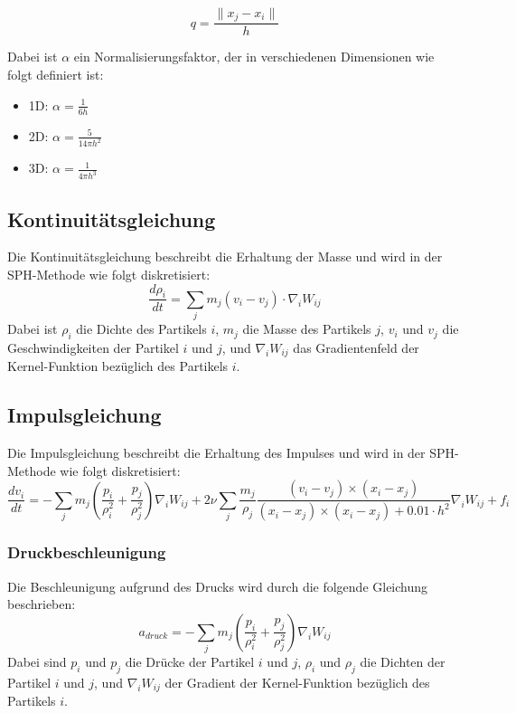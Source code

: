 \documentclass[a4paper, 12pt]{article}
\begin{document}
\begin{equation*}
	q = \frac{\|x_j - x_i\|}{h}
\end{equation*}

Dabei ist \(\alpha\) ein Normalisierungsfaktor, der in verschiedenen Dimensionen wie folgt definiert ist:
\begin{itemize}
	\item 1D: \(\alpha = \frac{1}{6h}\)
	\item 2D: \(\alpha = \frac{5}{14\pi h^2}\)
	\item 3D: \(\alpha = \frac{1}{4\pi h^3}\)
\end{itemize}

\subsection{Kontinuitätsgleichung}
Die Kontinuitätsgleichung beschreibt die Erhaltung der Masse und wird in der SPH-Methode wie folgt diskretisiert:
\[
\frac{d\rho_i}{dt} = \sum_j m_j (v_i - v_j) \cdot \nabla_i W_{ij}
\]
Dabei ist \(\rho_i\) die Dichte des Partikels \(i\), \(m_j\) die Masse des Partikels \(j\), \(v_i\) und \(v_j\) die Geschwindigkeiten der Partikel \(i\) und \(j\), und \(\nabla_i W_{ij}\) das Gradientenfeld der Kernel-Funktion bezüglich des Partikels \(i\).

\subsection{Impulsgleichung}
Die Impulsgleichung beschreibt die Erhaltung des Impulses und wird in der SPH-Methode wie folgt diskretisiert:
\[
\frac{d v_i}{dt} = -\sum_j m_j \left( \frac{p_i}{\rho_i^2} + \frac{p_j}{\rho_j^2} \right) \nabla_i W_{ij} + 2 \nu \sum_j \frac{m_j}{\rho_j} \frac{(v_i - v_j) \times (x_i - x_j)}{(x_i - x_j) \times (x_i - x_j) + 0.01\cdot h^2} \nabla_i W_{ij} + f_i
\]

\subsubsection{Druckbeschleunigung}
Die Beschleunigung aufgrund des Drucks wird durch die folgende Gleichung beschrieben:
\begin{equation} \label{equ:druckBesch}
	a_{druck} = -\sum_j m_j \left( \frac{p_i}{\rho_i^2} + \frac{p_j}{\rho_j^2} \right) \nabla_i W_{ij}
\end{equation}
Dabei sind \( p_i \) und \( p_j \) die Drücke der Partikel \( i \) und \( j \), \(\rho_i \) und \(\rho_j \) die Dichten der Partikel \( i \) und \( j \), und \( \nabla_i W_{ij} \) der Gradient der Kernel-Funktion bezüglich des Partikels \( i \).
\end{document}
